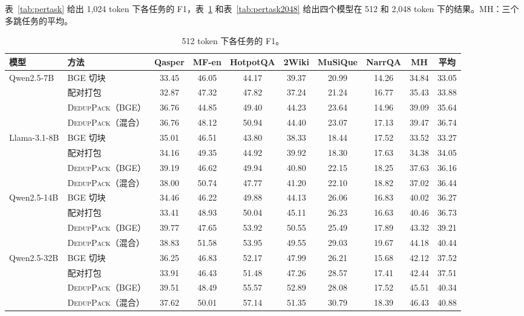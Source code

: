 \documentclass[11pt]{article}
\newcommand{\spk}{\textsc{DedupPack}}
\begin{document}
表~\ref{tab:pertask} 给出 1,024 token 下各任务的 F1，表~\ref{tab:pertask512} 和表~\ref{tab:pertask2048} 给出四个模型在 512 和 2,048 token 下的结果。MH：三个多跳任务的平均。

\begin{table}[t]
\centering
\small
\setlength{\tabcolsep}{4pt}
\begin{tabular}{llcccccc|cc}
\toprule
模型 & 方法 & Qasper & MF-en & HotpotQA & 2Wiki & MuSiQue & NarrQA & MH & 平均 \\
\midrule
\multirow{4}{*}{Qwen2.5-7B}
 & BGE 切块 & 33.45 & 46.05 & 44.17 & 39.37 & 20.99 & 14.26 & 34.84 & 33.05 \\
 & 配对打包 & 32.87 & 47.32 & 47.82 & 37.24 & 21.24 & 16.77 & 35.43 & 33.88 \\
 & \spk{}（BGE） & 36.76 & 44.85 & 49.40 & 44.23 & 23.64 & 14.96 & 39.09 & 35.64 \\
 & \spk{}（混合） & 36.76 & 48.12 & 50.94 & 44.40 & 23.07 & 17.13 & 39.47 & 36.74 \\
\midrule
\multirow{4}{*}{Llama-3.1-8B}
 & BGE 切块 & 35.01 & 46.51 & 43.80 & 38.33 & 18.44 & 17.52 & 33.52 & 33.27 \\
 & 配对打包 & 34.16 & 49.35 & 44.92 & 39.92 & 18.30 & 17.63 & 34.38 & 34.05 \\
 & \spk{}（BGE） & 39.19 & 46.62 & 49.94 & 40.80 & 22.15 & 18.25 & 37.63 & 36.16 \\
 & \spk{}（混合） & 38.00 & 50.74 & 47.77 & 41.20 & 22.10 & 18.82 & 37.02 & 36.44 \\
\midrule
\multirow{4}{*}{Qwen2.5-14B}
 & BGE 切块 & 34.46 & 46.22 & 49.88 & 44.13 & 26.06 & 16.83 & 40.02 & 36.27 \\
 & 配对打包 & 33.41 & 48.93 & 50.04 & 45.11 & 26.23 & 16.63 & 40.46 & 36.73 \\
 & \spk{}（BGE） & 39.77 & 47.65 & 53.92 & 50.55 & 25.49 & 17.89 & 43.32 & 39.21 \\
 & \spk{}（混合） & 38.83 & 51.58 & 53.95 & 49.55 & 29.03 & 19.67 & 44.18 & 40.44 \\
\midrule
\multirow{4}{*}{Qwen2.5-32B}
 & BGE 切块 & 36.25 & 46.83 & 52.17 & 47.99 & 26.21 & 15.68 & 42.12 & 37.52 \\
 & 配对打包 & 33.91 & 46.43 & 51.48 & 47.26 & 28.57 & 17.41 & 42.44 & 37.51 \\
 & \spk{}（BGE） & 39.51 & 48.49 & 55.57 & 52.89 & 28.08 & 17.52 & 45.51 & 40.34 \\
 & \spk{}（混合） & 37.62 & 50.01 & 57.14 & 51.35 & 30.79 & 18.39 & 46.43 & 40.88 \\
\bottomrule
\end{tabular}
\caption{512 token 下各任务的 F1。}
\label{tab:pertask512}
\end{table}
\end{document}
